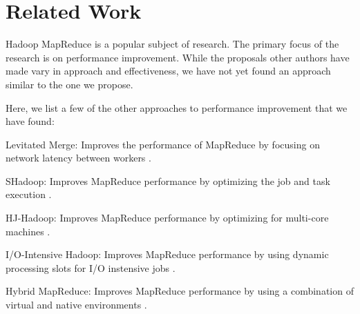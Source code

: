 \section{Related Work}
\label{section:relatedwork}
Hadoop MapReduce is a popular subject of research. The primary focus of the research
is on performance improvement. While the proposals other authors have made vary in
approach and effectiveness, we have not yet found an approach similar to the one
we propose.

Here, we list a few of the other approaches to performance improvement that we have found:
\begin{description}
  \item{Levitated Merge:} Improves the performance of MapReduce by focusing on network latency between workers \cite{LevitatedMerge}.
  \item{SHadoop:} Improves MapReduce performance by optimizing the job and task execution \cite{SHadoop}.
  \item{HJ-Hadoop:} Improves MapReduce performance by optimizing for multi-core machines \cite{HJHadoop}.
  \item{I/O-Intensive Hadoop:} Improves MapReduce performance by using dynamic processing slots for I/O instensive jobs \cite{IOIntensiveHadoop}.
  \item{Hybrid MapReduce:} Improves MapReduce performance by using a combination of virtual and native environments \cite{HybridMR}.
\end{description}
